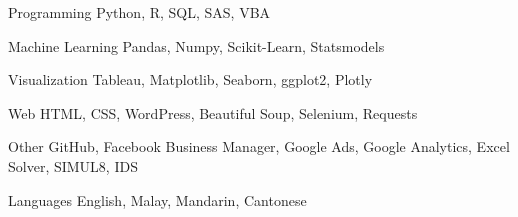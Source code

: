 

\begin{cvskills}
    \cvskill
        {Programming}
        {Python, R, SQL, SAS, VBA}

    \cvskill
        {Machine Learning}
        {Pandas, Numpy, Scikit-Learn, Statsmodels}

    \cvskill
        {Visualization}
        {Tableau, Matplotlib, Seaborn, ggplot2, Plotly}

    \cvskill
        {Web} 
        {HTML, CSS, WordPress, Beautiful Soup, Selenium, Requests}

    \cvskill
        {Other} 
        {GitHub, Facebook Business Manager, Google Ads, Google Analytics, Excel Solver, SIMUL8, IDS}

    \cvskill
        {Languages} 
        {English, Malay, Mandarin, Cantonese}

\end{cvskills}

